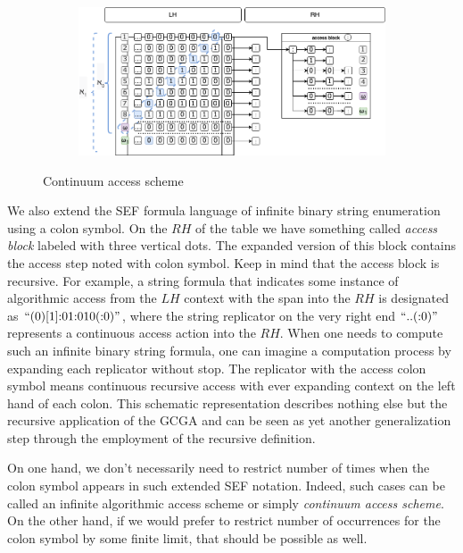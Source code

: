 \begin{figure}[h!]
  \centering
  \begin{subfigure}[b]{0.9\linewidth}
    \includegraphics[width=\linewidth]{appendix/access-scheme.png}
  \end{subfigure}
  \caption{Continuum access scheme}
  \label{fig:continuuma}
\end{figure}

We also extend the SEF formula language of infinite binary string enumeration using a colon symbol. On the $RH$ of the table we have something called \textit{access block} labeled with three vertical dots. The expanded version of this block contains the access step noted with colon symbol. Keep in mind that the access block is recursive. For example, a string formula that indicates some instance of algorithmic access from the $LH$ context with the span into the $RH$ is designated as $\text{``}(0)[1]{:}01{:}010({:}0)\text{''}$, where the string replicator on the very right end $\text{``}..({:}0)\text{''}$ represents a continuous access action into the $RH$. When one needs to compute such an infinite binary string formula, one can imagine a computation process by expanding each replicator without stop. The replicator with the access colon symbol means continuous recursive access with ever expanding context on the left hand of each colon. This schematic representation describes nothing else but the recursive application of the GCGA and can be seen as yet another generalization step through the employment of the recursive definition.

On one hand, we don't necessarily need to restrict number of times when the colon symbol appears in such extended SEF notation. Indeed, such cases can be called an infinite algorithmic access scheme or simply \textit{continuum access scheme}. On the other hand, if we would prefer to restrict number of occurrences for the colon symbol by some finite limit, that should be possible as well.

